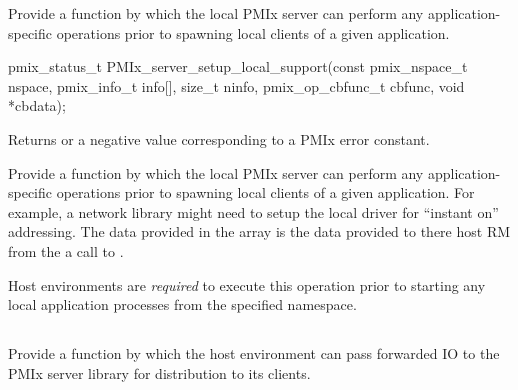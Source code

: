 \summary

Provide a function by which the local \ac{PMIx} server can perform any application-specific operations prior to spawning local clients of a given application.

\format

\cspecificstart
\begin{codepar}
pmix_status_t
PMIx_server_setup_local_support(const pmix_nspace_t nspace,
                                pmix_info_t info[], size_t ninfo,
                                pmix_op_cbfunc_t cbfunc,
                                void *cbdata);
\end{codepar}
\cspecificend

\begin{arglist}
\end{arglist}

Returns  or a negative value corresponding to a PMIx error constant.


\descr

Provide a function by which the local \ac{PMIx} server can perform any application-specific operations prior to spawning local clients of a given application. For example, a network library might need to setup the local driver for ``instant on'' addressing. The data provided in the  array is the data provided to there host \ac{RM} from the a call to .

\advicermstart
Host environments are \textit{required} to execute this operation prior to starting any local application processes from the specified namespace.
\advicermend

\subsection{}

\summary

Provide a function by which the host environment can pass forwarded \ac{IO} to the \ac{PMIx} server library for distribution to its clients.

